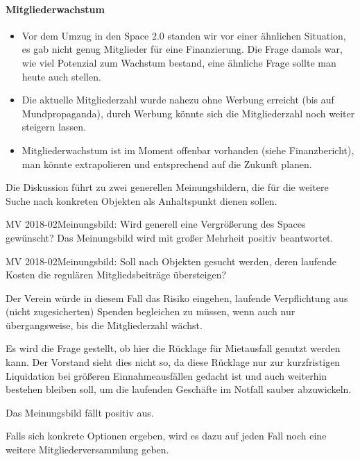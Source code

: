 \documentclass{s0minutes}
\begin{document}
\paragraph{Mitgliederwachstum}
\begin{itemize}
  \item Vor dem Umzug in den Space 2.0 standen wir vor einer ähnlichen
    Situation, es gab nicht genug Mitglieder für eine Finanzierung. Die Frage
    damals war, wie viel Potenzial zum Wachstum bestand, eine ähnliche Frage
    sollte man heute auch stellen.
  \item Die aktuelle Mitgliederzahl wurde nahezu ohne Werbung erreicht
    (bis auf Mundpropaganda), durch Werbung könnte sich die Mitgliederzahl noch
    weiter steigern lassen.
  \item Mitgliederwachstum ist im Moment offenbar vorhanden (siehe
    Finanzbericht), man könnte extrapolieren und entsprechend auf die Zukunft
    planen.
\end{itemize}

Die Diskussion führt zu zwei generellen Meinungsbildern, die für die weitere
Suche nach konkreten Objekten als Anhaltspunkt dienen sollen.

\begin{resolution}{MV 2018-02}{\consensus{\adopted}}{Meinungsbild: Wird
  generell eine Vergrößerung des Spaces gewünscht?}{}
  Das Meinungsbild wird mit großer Mehrheit positiv beantwortet.
\end{resolution}

\begin{resolution}{MV 2018-02}{\consensus{\adopted}}{Meinungsbild: Soll nach
  Objekten gesucht werden, deren laufende Kosten die regulären
  Mitgliedsbeiträge übersteigen?}{}

  Der Verein würde in diesem Fall das Risiko eingehen, laufende Verpflichtung
  aus (nicht zugesicherten) Spenden begleichen zu müssen, wenn auch nur
  übergangsweise, bis die Mitgliederzahl wächst.

  Es wird die Frage gestellt, ob hier die Rücklage für Mietausfall
  genutzt werden kann. Der Vorstand sieht dies nicht so, da diese Rücklage nur
  zur kurzfristigen Liquidation bei größeren Einnahmeausfällen gedacht ist und
  auch weiterhin bestehen bleiben soll, um die laufenden Geschäfte im Notfall
  sauber abzuwickeln.

  Das Meinungsbild fällt positiv aus.
\end{resolution}

Falls sich konkrete Optionen ergeben, wird es dazu auf jeden Fall noch eine
weitere Mitgliederversammlung geben.
\end{document}
